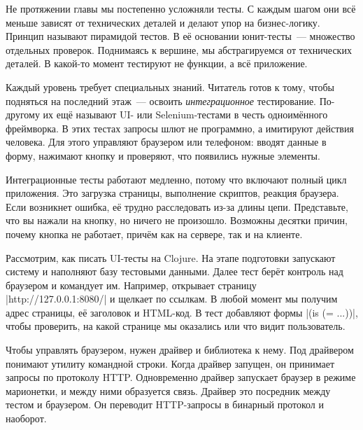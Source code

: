 
Не протяжении главы мы постепенно усложняли тесты. С каждым шагом они всё
меньше зависят от технических деталей и делают упор на бизнес-логику. Принцип
называют пирамидой тестов.
В её основании юнит-тесты~--- множество отдельных проверок. Поднимаясь к вершине,
мы абстрагируемся от технических деталей. В какой-то момент тестируют не функции,
а всё приложение.


Каждый уровень требует специальных знаний. Читатель готов к тому, чтобы
подняться на последний этаж~--- освоить \emph{интеграционное}
тестирование. По-другому их ещё называют UI- или Selenium-тестами в честь
одноимённого фреймворка. В этих тестах запросы шлют не программно, а имитируют действия
человека. Для этого управляют браузером или телефоном: вводят данные в форму,
нажимают кнопку и проверяют, что появились нужные элементы.

Интеграционные тесты работают медленно, потому что включают полный цикл
приложения. Это загрузка страницы, выполнение скриптов, реакция браузера. Если
возникнет ошибка, её трудно расследовать из-за длины цепи. Представьте, что вы
нажали на кнопку, но ничего не произошло. Возможны десятки причин, почему кнопка
не работает, причём как на сервере, так и на клиенте.

Рассмотрим, как писать UI-тесты на Clojure. На этапе подготовки запускают
систему и наполняют базу тестовыми данными. Далее тест берёт контроль над
браузером и командует им. Например, открывает страницу \spverb|http://127.0.0.1:8080/|
и щелкает по ссылкам. В любой момент мы получим адрес страницы, её заголовок
и HTML-код. В тест добавляют формы \spverb|(is (= ...))|, чтобы проверить,
на какой странице мы оказались или что видит пользователь.


Чтобы управлять браузером, нужен драйвер и библиотека к нему. Под драйвером
понимают утилиту командной строки. Когда драйвер запущен, он принимает запросы
по протоколу HTTP. Одновременно драйвер запускает браузер в режиме марионетки, и
между ними образуется связь. Драйвер это посредник между тестом и браузером. Он
переводит HTTP-запросы в бинарный протокол и наоборот.


